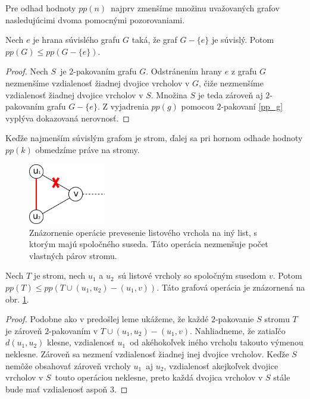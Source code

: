 Pre odhad hodnoty $pp(n)$ najprv zmenšíme množinu uvažovaných grafov nasledujúcimi dvoma
pomocnými pozorovaniami.

\begin{lema}
    Nech $e$ je hrana súvislého grafu $G$ taká, že graf $G-\{e\}$ je súvislý. Potom
    $pp(G) \leq pp(G-\{e\})$.
\end{lema}

\begin{proof}
    Nech $S$ je $2$-pakovaním grafu $G$. Odstránením hrany $e$ z grafu $G$ nezmenšíme
    vzdialenosť žiadnej dvojice vrcholov v $G$, čiže nezmenšíme vzdialenosť žiadnej
    dvojice vrcholov v $S$. Množina $S$ je teda zároveň aj $2$-pakovaním grafu $G-\{e\}$.
    Z vyjadrenia $pp(g)$ pomocou $2$-pakovaní \ref{pp_g} vyplýva dokazovaná nerovnosť.
\end{proof}

Keďže najmenším súvislým grafom je strom, ďalej sa pri hornom odhade hodnoty $pp(k)$ obmedzíme
práve na stromy.

\begin{figure}

\centerline{\includegraphics[width=0.3\textwidth]{images/pp_prevesenie.pdf}}

\caption[Prevesenie listového vrcholu]{Znázornenie operácie prevesenie listového vrchola
na iný list, s ktorým majú spoločného suseda. Táto operácia nezmenšuje počet vlastných
párov stromu.}

\label{pp:prevesenie}

\end{figure}

\begin{lema}
   Nech $T$ je strom, nech $u_1$ a $u_2$ sú listové vrcholy so spoločným susedom $v$. Potom
   $pp(T) \leq pp(T \cup (u_1, u_2) - (u_1, v))$. Táto grafová operácia je znázornená na
   obr. \ref{pp:prevesenie}.
\end{lema}

\begin{proof}
    Podobne ako v predošlej leme ukážeme, že každé $2$-pakovanie $S$ stromu $T$ je zároveň $2$-pakovaním
    v $T \cup (u_1, u_2) - (u_1, v)$. Nahliadneme, že zatiaľčo $d(u_1, u_2)$ klesne, vzdialenosť
    $u_1$ od akéhokoľvek iného vrcholu takouto výmenou neklesne. Zároveň sa nezmení vzdialenosť
    žiadnej inej dvojice vrcholov. Keďže $S$ nemôže obsahovať zároveň vrcholy $u_1$ aj $u_2$,
    vzdialenosť akejkoľvek dvojice vrcholov v $S$ touto operáciou neklesne, preto každá dvojica
    vrcholov v $S$ stále bude mať vzdialenosť aspoň $3$.
\end{proof}

